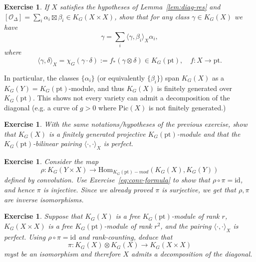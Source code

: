 \documentclass[11pt]{amsart}
\newtheorem{exercise}[dummy]{Exercise}
\theoremstyle{definition}
\newcommand{\Oc}{\mathcal{O}}
\newcommand{\Hom}{\mathrm{Hom}}
\newcommand{\Pic}{\mathrm{Pic}}
\numberwithin{equation}{subsection}
\numberwithin{figure}{subsection}
\newcommand{\pt}{\mathrm{pt}}
\begin{document}
\begin{exercise}
If $X$ satisfies the hypotheses of Lemma~\ref{lem:diag-res} and $[\Oc_\Delta]=\sum_i\alpha_i\boxtimes\beta_i\in K_G(X\times X)$, show that for any class $\gamma\in K_G(X)$ we have
$$
\gamma = \sum_i \langle \gamma,\beta_i\rangle_X \alpha_i,
$$
where 
$$
\langle \gamma,\delta\rangle_X = \chi_G(\gamma\cdot\delta) := f_*(\gamma\otimes\delta)\in K_G(\pt),\quad f:X\rightarrow \pt.
$$
\end{exercise}
In particular, the classes $\{\alpha_i\}$ (or equivalently $\{\beta_i\}$) span $K_G(X)$ as a $K_G(Y)=K_G(\pt)$-module, and thus $K_G(X)$ is finitely generated over $K_G(\pt)$. This shows not every variety can admit a decomposition of the diagonal (e.g. a curve of $g>0$ where $\Pic(X)$ is not finitely generated.)

\begin{exercise}
With the same notations/hypotheses of the previous exercise, show that $K_G(X)$ is a finitely generated projective $K_G(\pt)$-module and that the $K_G(\pt)$-bilinear pairing $\langle\cdot,\cdot\rangle_X$ is perfect.
\end{exercise}

{
\begin{exercise}
Consider the map
$$
\rho\colon K_G(Y\times X)\rightarrow \Hom_{K_G(\pt)-mod}(K_G(X),K_G(Y))
$$
defined by convolution. Use Exercise~\ref{eq:conv-formula} to show that $\rho\circ\pi=\mathrm{id}$, and hence $\pi$ is injective. Since we already proved $\pi$ is surjective, we get that $\rho,\pi$ are inverse isomorphisms.
\end{exercise}
}

\begin{exercise}
\label{ex:alg-crit}
Suppose that $K_G(X)$ is a free $K_G(\pt)$-module of rank $r$, $K_G(X\times X)$ is a free $K_G(\pt)$-module of rank $r^2$, and the pairing $\langle\cdot,\cdot\rangle_X$ is perfect. Using $\rho\circ\pi=\mathrm{id}$ and rank-counting, deduce that 
$$
\pi\colon K_G(X)\otimes K_G(X)\rightarrow K_G(X\times X)
$$ myst be an isomorphism and therefore $X$ admits a decomposition of the diagonal.
\end{exercise}
\end{document}
